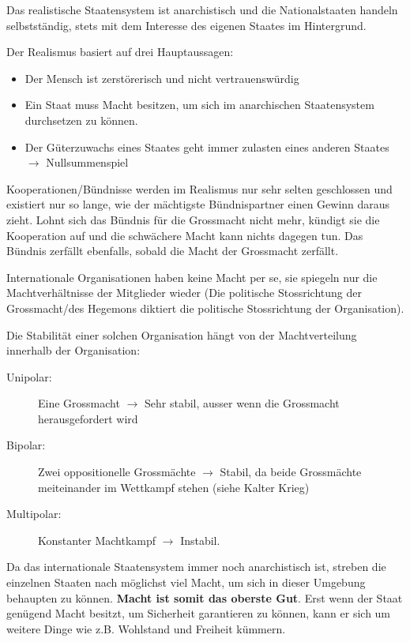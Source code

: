 \documentclass[a4paper, 11pt]{article}
\begin{document}
\vspace{10px}

\noindent Das realistische Staatensystem ist anarchistisch und die Nationalstaaten handeln selbstständig, stets mit dem Interesse des eigenen Staates im Hintergrund.

\vspace{10px}

\noindent Der Realismus basiert auf drei Hauptaussagen:

\begin{itemize}
	\item Der Mensch ist zerstörerisch und nicht vertrauenswürdig
	\item Ein Staat muss Macht besitzen, um sich im anarchischen Staatensystem durchsetzen zu können.
	\item Der Güterzuwachs eines Staates geht immer zulasten eines anderen Staates $\rightarrow$ Nullsummenspiel
\end{itemize}

Kooperationen/Bündnisse werden im Realismus nur sehr selten geschlossen und existiert nur so lange, wie der mächtigste Bündnispartner einen Gewinn daraus zieht. Lohnt sich das Bündnis für die Grossmacht nicht mehr, kündigt sie die Kooperation auf und die schwächere Macht kann nichts dagegen tun. Das Bündnis zerfällt ebenfalls, sobald die Macht der Grossmacht zerfällt.

Internationale Organisationen haben keine Macht per se, sie spiegeln nur die Machtverhältnisse der Mitglieder wieder (Die politische Stossrichtung der Grossmacht/des Hegemons diktiert die politische Stossrichtung der Organisation). 

\vspace{10px}

\noindent Die Stabilität einer solchen Organisation hängt von der Machtverteilung innerhalb der Organisation:

\begin{description}
	\item[Unipolar: ] Eine Grossmacht $\rightarrow$ Sehr stabil, ausser wenn die Grossmacht herausgefordert wird
	\item[Bipolar: ] Zwei oppositionelle Grossmächte $\rightarrow$ Stabil, da beide Grossmächte meiteinander im Wettkampf stehen (siehe Kalter Krieg)
	\item[Multipolar: ] Konstanter Machtkampf $\rightarrow$ Instabil.
\end{description}

Da das internationale Staatensystem immer noch anarchistisch ist, streben die einzelnen Staaten nach möglichst viel Macht, um sich in dieser Umgebung behaupten zu können. \textbf{Macht ist somit das oberste Gut}. Erst wenn der Staat genügend Macht besitzt, um Sicherheit garantieren zu können, kann er sich um weitere Dinge wie z.B. Wohlstand und Freiheit kümmern.
\end{document}

